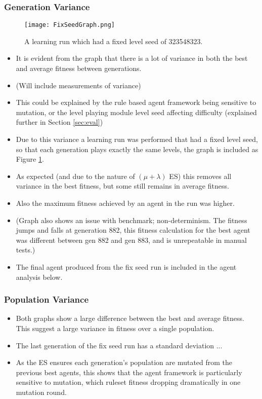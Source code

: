 \clearpage

\subsubsection{Generation Variance}

\begin{figure}[t]
	\centering
	\texttt{[image: FixSeedGraph.png]}
	\caption{A learning run which had a fixed level seed of 323548323.}
	\label{fig:fixgraph}
\end{figure}

\begin{itemize}
\item It is evident from the graph that there is a lot of variance in both the best and average fitness between generations.
\item (Will include measurements of variance)
\item This could be explained by the rule based agent framework being sensitive to mutation, or the level playing module level seed affecting difficulty (explained further in Section \ref{sec:eval})
\item Due to this variance a learning run was performed that had a fixed level seed, so that each generation plays exactly the same levels, the graph is included as Figure \ref{fig:fixgraph}.
\item As expected (and due to the nature of $(\mu  + \lambda)$ ES) this removes all variance in the best fitness, but some still remains in average fitness.
\item Also the maximum fitness achieved by an agent in the run was higher.
\item (Graph also shows an issue with benchmark; non-determinism. The fitness jumps and falls at generation 882, this fitness calculation for the best agent was different between gen 882 and gen 883, and is unrepeatable in manual tests.)
\item The final agent produced from the fix seed run is included in the agent analysis below.
\end{itemize}

\subsubsection{Population Variance}

\begin{itemize}
\item Both graphs show a large difference between the best and average fitness. This suggest a large variance in fitness over a single population.
\item The last generation of the fix seed run has a standard deviation ...
\item As the ES ensures each generation's population are mutated from the previous best agents, this shows that the agent framework is particularly sensitive to mutation, which ruleset fitness dropping dramatically in one mutation round.
\end{itemize}


